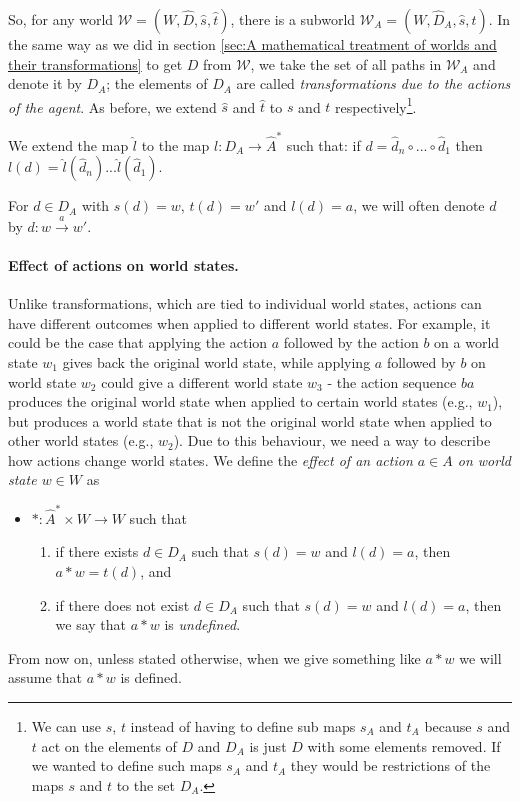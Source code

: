 So, for any world $\mathscr{W} = (W, \hat{D}, \hat{s}, \hat{t})$, there is a subworld $\mathscr{W}_{A} = (W, \hat{D}_{A}, \hat{s}, \hat{t})$.
In the same way as we did in section \ref{sec:A mathematical treatment of worlds and their transformations} to get $D$ from $\mathscr{W}$, we take the set of all paths in $\mathscr{W}_{A}$ and denote it by $D_{A}$; the elements of $D_{A}$ are called \emph{transformations due to the actions of the agent}.
As before, we extend $\hat{s}$ and $\hat{t}$ to $s$ and $t$ respectively\footnote{
We can use $s$, $t$ instead of having to define sub maps $s_{A}$ and $t_{A}$ because $s$ and $t$ act on the elements of $D$ and $D_{A}$ is just $D$ with some elements removed.
If we wanted to define such maps $s_{A}$ and $t_{A}$ they would be restrictions of the maps $s$ and $t$ to the set $D_{A}$.
}.

We extend the map $\hat{l}$ to the map $l: D_{A} \to \hat{A}^{*}$ such that:
if $d = \hat{d}_{n} \circ ... \circ \hat{d}_{1}$ then $l(d) = \hat{l}(\hat{d}_{n}) ... \hat{l}(\hat{d}_{1})$.

For $d \in D_{A}$ with $s(d) = w$, $t(d) = w'$ and $l(d) = a$, we will often denote $d$ by $d: w \xrightarrow{a} w'$.

\paragraph{Effect of actions on world states.}
Unlike transformations, which are tied to individual world states, actions can have different outcomes when applied to different world states.
For example, it could be the case that applying the action $a$ followed by the action $b$ on a world state $w_{1}$ gives back the original world state, while applying $a$ followed by $b$ on world state $w_{2}$ could give a different world state $w_{3}$ - the action sequence $ba$ produces the original world state when applied to certain world states (e.g., $w_{1}$), but produces a world state that is not the original world state when applied to other world states (e.g., $w_{2}$).
Due to this behaviour, we need a way to describe how actions change world states.
We define the \emph{effect of an action $a \in A$ on world state $w \in W$} as

\begin{itemize}
    \item[] $*: \hat{A}^{*} \times W \to W$ such that
    \begin{enumerate}[(1)]
        \item if there exists $d \in D_{A}$ such that $s(d) = w$ and $l(d) = a$, then $a * w = t(d)$, and
        \item if there does not exist $d \in D_{A}$ such that $s(d) = w$ and $l(d) = a$, then we say that $a * w$ is \emph{undefined}.
    \end{enumerate}
\end{itemize}
From now on, unless stated otherwise, when we give something like $a * w$ we will assume that $a * w$ is defined.

